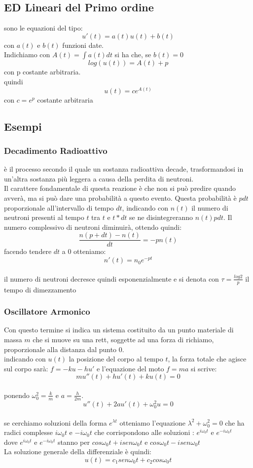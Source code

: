 \documentclass[a4paper,twoside]{article}
\theoremstyle{definition}
\numberwithin{theorem}{section}
\begin{document}
\subsection{ED Lineari del Primo ordine}
sono le equazioni del tipo: $$u'(t)=a(t)u(t)+b(t)$$
con $a(t)$ e $b(t)$ funzioni date.\\
Indichiamo con $A(t)=\int a(t)dt$ si ha che, se $b(t)=0$ $$log(u(t))=A(t)+p$$ con p costante arbitraria.\\
quindi $$u(t)= ce^{A(t)}$$
con $c=e^p$ costante arbitraria
\subsection{Esempi}
\subsubsection{Decadimento Radioattivo}
è il processo secondo il quale un sostanza radioattiva decade, trasformandosi in un'altra sostanza più leggera a causa della perdita di neutroni.\\
Il carattere fondamentale di questa reazione è che non si può predire quando avverà, ma si può dare una probabilità a questo evento. Questa probabilità è $pdt$ proporzionale all'intervallo di tempo $dt$, indicando con $n(t)$ il numero di neutroni presenti al tempo $t$ tra $t$ e $t*dt$ se ne disintegreranno $n(t)pdt$. Il numero complessivo di neutroni diminuirà, ottendo quindi:$$\frac{n(p+dt)-n(t)}{dt}=-pn(t)$$
facendo tendere $dt$ a $0$ otteniamo: $$n'(t)=n_0e^{-pt}$$\\
il numero di neutroni decresce quindi esponenzialmente e si denota con $\tau=\frac{log2}{p}$ il tempo di dimezzamento
\subsubsection{Oscillatore Armonico}
Con questo termine si indica un sistema costituito da un punto materiale di massa $m$ che si muove su una rett, soggette ad una forza di richiamo, proporzionale alla distanza dal punto $0$. \\
indicando con $u(t)$ la posizione del corpo al tempo $t$, la forza totale che agisce sul corpo sarà: $f=-ku-hu'$ e l'equazione del moto $f=ma$ si scrive: $$mu''(t)+hu'(t)+ku(t)=0$$\\
ponendo $\omega_0^2=\frac{k}{m}$ e $a=\frac{h}{2m}$.\\
$$u''(t)+2au'(t)+\omega_0^2u=0$$ \\
se cerchiamo soluzioni della forma $e^{\lambda t}$ otteniamo l'equazione $\lambda^2 + \omega_0^2=0$ che ha radici complesse $i\omega_0t$ e $-i\omega_0t$ che corrispondono alle soluzioni : $e^{i\omega_0t}$ e $e^{-i\omega_0t}$\\
dove  $e^{i\omega_0t}$ e $e^{-i\omega_0t}$ stanno per $cos\omega_0t+isen\omega_0t$ e $cos\omega_0t-isen\omega_0t$ \\
La soluzione generale della differenziale è quindi: $$u(t)=c_1sen\omega_0t+c_2cos\omega_0t$$\\
\end{document}
